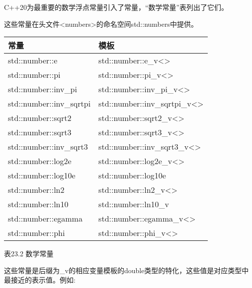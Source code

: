 C++20为最重要的数学浮点常量引入了常量，“数学常量”表列出了它们。

这些常量在头文件<numbers>的命名空间std::numbers中提供。

\begin{longtable}[c]{|l|l|}
\hline
\textbf{常量}        & \textbf{模板}                                    \\ \hline
\endfirsthead
%
\endhead
%
std::number::e           & std::number::e\_v\textless{}\textgreater{}           \\ \hline
std::number::pi          & std::number::pi\_v\textless{}\textgreater{}          \\ \hline
std::number::inv\_pi     & std::number::inv\_pi\_v\textless{}\textgreater{}     \\ \hline
std::number::inv\_sqrtpi & std::number::inv\_sqrtpi\_v\textless{}\textgreater{} \\ \hline
std::number::sqrt2       & std::number::sqrt2\_v\textless{}\textgreater{}       \\ \hline
std::number::sqrt3       & std::number::sqrt3\_v\textless{}\textgreater{}       \\ \hline
std::number::inv\_sqrt3  & std::number::inv\_sqrt3\_v\textless{}\textgreater{}  \\ \hline
std::number::log2e       & std::number::log2e\_v\textless{}\textgreater{}       \\ \hline
std::number::log10e      & std::number::log10e                                  \\ \hline
std::number::ln2         & std::number::ln2\_v\textless{}\textgreater{}         \\ \hline
std::number::ln10        & std::number::ln10\_v                                 \\ \hline
std::number::egamma      & std::number::egamma\_v\textless{}\textgreater{}      \\ \hline
std::number::phi         & std::number::phi\_v\textless{}\textgreater{}         \\ \hline
\end{longtable}

\begin{center}
表23.2 数学常量
\end{center}

这些常量是后缀为\_v的相应变量模板的double类型的特化，这些值是对应类型中最接近的表示值。例如:

